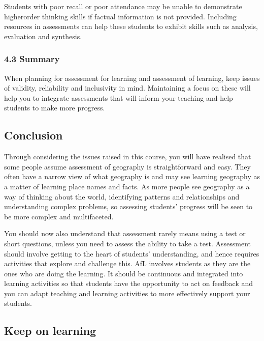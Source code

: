 \documentclass[letterpaper,10pt,english]{sphinxmanual}
\let\sphinxpxdimen\pdfpxdimen\else\newdimen\sphinxpxdimen
\begin{document}
Students with poor recall or poor attendance may be unable to demonstrate higher\sphinxhyphen{}order thinking skills if factual information is not provided. Including resources in assessments can help these students to exhibit skills such as analysis, evaluation and synthesis.


\subsubsection{4.3 Summary}
\label{\detokenize{content/session_00/Part_00_04:4.3-Summary}}
When planning for assessment for learning and assessment of learning, keep issues of validity, reliability and inclusivity in mind. Maintaining a focus on these will help you to integrate assessments that will inform your teaching and help students to make more progress.


\subsection{Conclusion}
\label{\detokenize{content/session_00/Part_00_05:Conclusion}}\label{\detokenize{content/session_00/Part_00_05::doc}}
Through considering the issues raised in this course, you will have realised that some people assume assessment of geography is straightforward and easy. They often have a narrow view of what geography is and may see learning geography as a matter of learning place names and facts. As more people see geography as a way of thinking about the world, identifying patterns and relationships and understanding complex problems, so assessing students’ progress will be seen to be more complex and
multifaceted.

You should now also understand that assessment rarely means using a test or short questions, unless you need to assess the ability to take a test. Assessment should involve getting to the heart of students’ understanding, and hence requires activities that explore and challenge this. AfL involves students as they are the ones who are doing the learning. It should be continuous and integrated into learning activities so that students have the opportunity to act on feedback and you can adapt
teaching and learning activities to more effectively support your students.


\subsection{Keep on learning}
\label{\detokenize{content/session_00/Part_00_06:Keep-on-learning}}\label{\detokenize{content/session_00/Part_00_06::doc}}
\sphinxincludegraphics[width=300\sphinxpxdimen,height=200\sphinxpxdimen]{{ol_skeleton_keeponlearning_image}.jpg}
\end{document}
